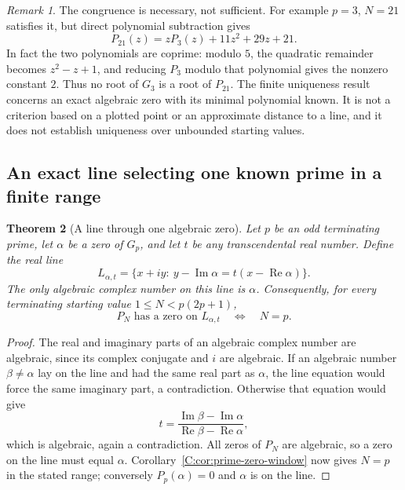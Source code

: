 \documentclass[11pt,a4paper]{article}
\newtheorem{theorem}{Theorem}[section]
\theoremstyle{definition}
\theoremstyle{remark}
\newtheorem{remark}[theorem]{Remark}
\numberwithin{equation}{section}
\begin{document}
\begin{remark}
The congruence is necessary, not sufficient. For example $p=3$, $N=21$
satisfies it, but direct polynomial subtraction gives
\[
 P_{21}(z)=zP_3(z)+11z^2+29z+21.
\]
In fact the two polynomials are coprime: modulo $5$, the quadratic
remainder becomes $z^2-z+1$, and reducing $P_3$ modulo that polynomial
gives the nonzero constant $2$. Thus no root of $G_3$ is a root of
$P_{21}$.
The finite uniqueness result concerns an exact algebraic zero with its
minimal polynomial known. It is not a criterion based on a plotted point
or an approximate distance to a line, and it does not establish uniqueness
over unbounded starting values.
\end{remark}

\subsection{An exact line selecting one known prime in a finite range}

\begin{theorem}[A line through one algebraic zero]
\label{C:thm:transcendental-selector-line}
Let $p$ be an odd terminating prime, let $\alpha$ be a zero of $G_p$,
and let $t$ be any transcendental real number. Define the real line
\[
 L_{\alpha,t}=\{x+iy:\ y-\operatorname{Im}\alpha
                  =t(x-\operatorname{Re}\alpha)\}.
\]
The only algebraic complex number on this line is $\alpha$.
Consequently, for every terminating starting value
$1\leq N<p(2p+1)$,
\[
 P_N\text{ has a zero on }L_{\alpha,t}
 \quad\Longleftrightarrow\quad N=p.
\]
\end{theorem}

\begin{proof}
The real and imaginary parts of an algebraic complex number are algebraic,
since its complex conjugate and $i$ are algebraic. If an algebraic number
$\beta\ne\alpha$ lay on the line and had the same real part as $\alpha$,
the line equation would force the same imaginary part, a contradiction.
Otherwise that equation would give
\[
 t=\frac{\operatorname{Im}\beta-\operatorname{Im}\alpha}
         {\operatorname{Re}\beta-\operatorname{Re}\alpha},
\]
which is algebraic, again a contradiction. All zeros of $P_N$ are algebraic,
so a zero on the line must equal $\alpha$.
Corollary~\ref{C:cor:prime-zero-window} now gives $N=p$ in the stated range;
conversely $P_p(\alpha)=0$ and $\alpha$ is on the line.
\end{proof}
\end{document}
